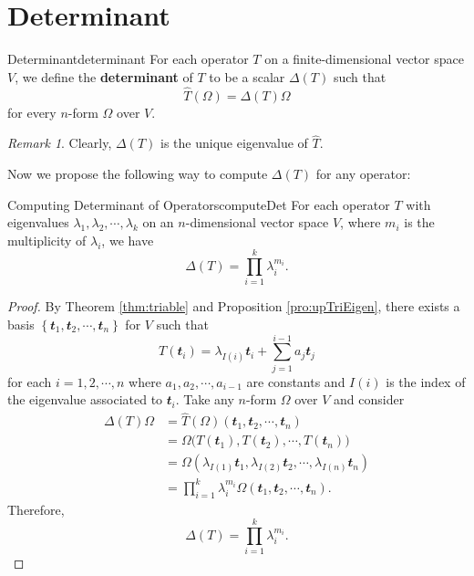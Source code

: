 \documentclass[math, code]{amznotes}
\theoremstyle{remark}
\newtheorem*{remark}{Remark}
\begin{document}
\section{Determinant}
\begin{dfnbox}{Determinant}{determinant}
    For each operator $T$ on a finite-dimensional vector space $V$, we define the {\color{red} \textbf{determinant}} of $T$ to be a scalar $\Delta(T)$ such that 
    \begin{equation*}
        \widehat{T}(\Omega) = \Delta(T)\Omega
    \end{equation*}
    for every $n$-form $\Omega$ over $V$.
\end{dfnbox}
\begin{notebox}
    \begin{remark}
        Clearly, $\Delta(T)$ is the unique eigenvalue of $\widehat{T}$.
    \end{remark}
\end{notebox}
Now we propose the following way to compute $\Delta(T)$ for any operator:
\begin{probox}{Computing Determinant of Operators}{computeDet}
    For each operator $T$ with eigenvalues $\lambda_1, \lambda_2, \cdots, \lambda_k$ on an $n$-dimensional vector space $V$, where $m_i$ is the multiplicity of $\lambda_i$, we have 
    \begin{equation*}
        \Delta(T) = \prod_{i = 1}^{k}\lambda_i^{m_i}.
    \end{equation*}
    \tcblower
    \begin{proof}
        By Theorem \ref{thm:triable} and Proposition \ref{pro:upTriEigen}, there exists a basis $\left\{\mathbfit{t}_1, \mathbfit{t}_2, \cdots, \mathbfit{t}_n\right\}$ for $V$ such that 
        \begin{equation*}
            T\left(\mathbfit{t}_i\right) = \lambda_{I(i)}\mathbfit{t}_i + \sum_{j = 1}^{i - 1}a_j\mathbfit{t}_j
        \end{equation*}
        for each $i = 1, 2, \cdots, n$ where $a_1, a_2, \cdots, a_{i - 1}$ are constants and $I(i)$ is the index of the eigenvalue associated to $\mathbfit{t}_i$. Take any $n$-form $\Omega$ over $V$ and consider 
        \begin{align*}
            \Delta(T)\Omega & = \widehat{T}(\Omega)\left(\mathbfit{t}_1, \mathbfit{t}_2, \cdots, \mathbfit{t}_n\right) \\
            & = \Omega\bigl(T(\mathbfit{t}_1), T(\mathbfit{t}_2), \cdots, T(\mathbfit{t}_n)\bigr) \\
            & = \Omega\left(\lambda_{I(1)}\mathbfit{t}_1, \lambda_{I(2)}\mathbfit{t}_2, \cdots, \lambda_{I(n)}\mathbfit{t}_n\right) \\
            & = \prod_{i = 1}^k\lambda_i^{m_i}\Omega\left(\mathbfit{t}_1, \mathbfit{t}_2, \cdots, \mathbfit{t}_n\right).
        \end{align*}
        Therefore, 
        \begin{equation*}
            \Delta(T) = \prod_{i = 1}^{k}\lambda_i^{m_i}.
        \end{equation*}
    \end{proof}
\end{probox}
\end{document}
